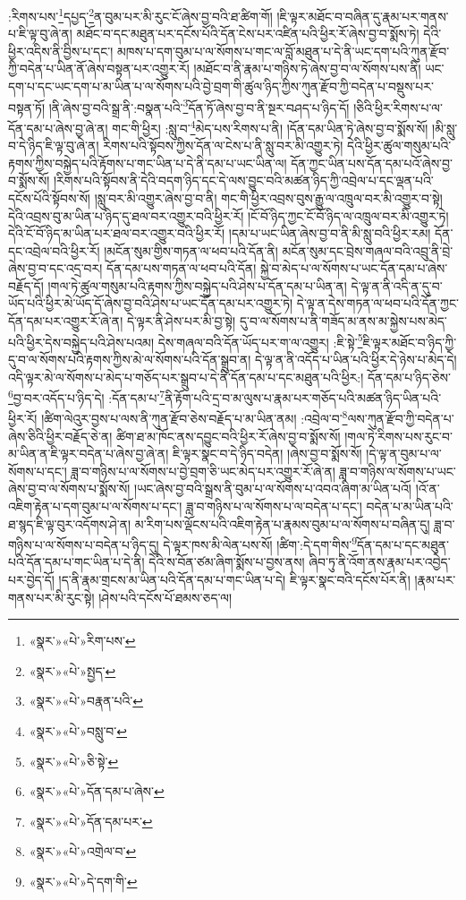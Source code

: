 :རིགས་པས་\footnote{«སྣར་»«པེ་»རིག་པས་}དཔྱད་\footnote{«སྣར་»«པེ་»སྤྱད་}ན་བུམ་པར་མི་རུང་ངོ་ཞེས་བྱ་བའི་ཐ་ཚིག་གོ། །ཇི་ལྟར་མཐོང་བ་བཞིན་དུ་རྣམ་པར་གནས་པ་ཇི་ལྟ་བུ་ཞེ་ན། མཐོང་བ་དང་མཐུན་པར་དངོས་པོའི་དོན་ངེས་པར་འཛིན་པའི་ཕྱིར་རོ་ཞེས་བྱ་བ་སྨོས་ཏེ། དེའི་ཕྱིར་འདིས་ནི་བྱིས་པ་དང་། མཁས་པ་དག་བུམ་པ་ལ་སོགས་པ་གང་ལ་བློ་མཐུན་པ་དེ་ནི་ཡང་དག་པའི་ཀུན་རྫོབ་ཀྱི་བདེན་པ་ཡིན་ནོ་ཞེས་བསྟན་པར་འགྱུར་རོ། །མཐོང་བ་ནི་རྣམ་པ་གཉིས་ཏེ་ཞེས་བྱ་བ་ལ་སོགས་པས་ནི། ཡང་དག་པ་དང་ཡང་དག་པ་མ་ཡིན་པ་ལ་སོགས་པའི་བྱེ་བྲག་གི་ཚུལ་ཉིད་ཀྱིས་ཀུན་རྫོབ་ཀྱི་བདེན་པ་བསྡུས་པར་བསྟན་ཏོ། །ནི་ཞེས་བྱ་བའི་སྒྲ་ནི་:བསྣན་པའི་\footnote{«སྣར་»«པེ་»བརྣན་པའི་}དོན་ཏོ་ཞེས་བྱ་བ་ནི་སྔར་བཤད་པ་ཉིད་དོ། །ཅིའི་ཕྱིར་རིགས་པ་ལ་དོན་དམ་པ་ཞེས་བྱ་ཞེ་ན། གང་གི་ཕྱིར། :སླུ་བ་\footnote{«སྣར་»«པེ་»བསླུ་བ་}མེད་པས་རིགས་པ་ནི། །དོན་དམ་ཡིན་ཏེ་ཞེས་བྱ་བ་སྨོས་སོ། །མི་སླུ་བ་དེ་ཉིད་ཇི་ལྟ་བུ་ཞེ་ན། རིགས་པའི་སྟོབས་ཀྱིས་དོན་ལ་ངེས་པ་ནི་སླུ་བར་མི་འགྱུར་ཏེ། དེའི་ཕྱིར་ཚུལ་གསུམ་པའི་རྟགས་ཀྱིས་བསྐྱེད་པའི་རྟོགས་པ་གང་ཡིན་པ་དེ་ནི་དམ་པ་ཡང་ཡིན་ལ། དོན་ཀྱང་ཡིན་པས་དོན་དམ་པའོ་ཞེས་བྱ་བ་སྨོས་སོ། །རིགས་པའི་སྟོབས་ནི་དེའི་བདག་ཉིད་དང་དེ་ལས་བྱུང་བའི་མཚན་ཉིད་ཀྱི་འབྲེལ་པ་དང་ལྡན་པའི་དངོས་པོའི་སྟོབས་སོ། །སླུ་བར་མི་འགྱུར་ཞེས་བྱ་བ་ནི། གང་གི་ཕྱིར་འབྲས་བུས་རྒྱུ་ལ་འཁྲུལ་བར་མི་འགྱུར་བ་སྟེ། དེའི་འབྲས་བུ་མ་ཡིན་པ་ཉིད་དུ་ཐལ་བར་འགྱུར་བའི་ཕྱིར་རོ། །ངོ་བོ་ཉིད་ཀྱང་ངོ་བོ་ཉིད་ལ་འཁྲུལ་བར་མི་འགྱུར་ཏེ། དེའི་ངོ་བོ་ཉིད་མ་ཡིན་པར་ཐལ་བར་འགྱུར་བའི་ཕྱིར་རོ། །དམ་པ་ཡང་ཡིན་ཞེས་བྱ་བ་ནི་མི་སླུ་བའི་ཕྱིར་རམ། དོན་དང་འབྲེལ་བའི་ཕྱིར་རོ། །མངོན་སུམ་གྱིས་གཏན་ལ་ཕབ་པའི་དོན་ནི། མངོན་སུམ་དང་བྲེས་གཞལ་བའི་འབྲུ་ནི་བྲེ་ཞེས་བྱ་བ་དང་འདྲ་བར། དོན་དམ་པས་གཏན་ལ་ཕབ་པའི་དོན། སྐྱེ་བ་མེད་པ་ལ་སོགས་པ་ཡང་དོན་དམ་པ་ཞེས་བརྗོད་དོ། །གལ་ཏེ་ཚུལ་གསུམ་པའི་རྟགས་ཀྱིས་བསྐྱེད་པའི་ཤེས་པ་དོན་དམ་པ་ཡིན་ན། དེ་ལྟ་ན་ནི་འདི་ན་དུ་བ་ཡོད་པའི་ཕྱིར་མེ་ཡོད་དོ་ཞེས་བྱ་བའི་ཤེས་པ་ཡང་དོན་དམ་པར་འགྱུར་ཏེ། དེ་ལྟ་ན་དེས་གཏན་ལ་ཕབ་པའི་དོན་ཀྱང་དོན་དམ་པར་འགྱུར་རོ་ཞེ་ན། དེ་ལྟར་ནི་ཤེས་པར་མི་བྱ་སྟེ། དུ་བ་ལ་སོགས་པ་ནི་གཟོད་མ་ནས་མ་སྐྱེས་པས་མེད་པའི་ཕྱིར་དེས་བསྐྱེད་པའི་ཤེས་པའམ། དེས་གཞལ་བའི་དོན་ཡོད་པར་ག་ལ་འགྱུར། :ཇི་སྟེ་\footnote{«སྣར་»«པེ་»ཅི་སྟེ་}ཇི་ལྟར་མཐོང་བ་ཉིད་ཀྱི་དུ་བ་ལ་སོགས་པའི་རྟགས་ཀྱིས་མེ་ལ་སོགས་པའི་དོན་སྒྲུབ་ན། དེ་ལྟ་ན་ནི་འདོད་པ་ཡིན་པའི་ཕྱིར་དེ་ཉེས་པ་མེད་དེ། འདི་ལྟར་མེ་ལ་སོགས་པ་མེད་པ་གཅོད་པར་སྒྲུབ་པ་དེ་ནི་དོན་དམ་པ་དང་མཐུན་པའི་ཕྱིར:། དོན་དམ་པ་ཉིད་ཅེས་\footnote{«སྣར་»«པེ་»དོན་དམ་པ་ཞེས་}བྱ་བར་འདོད་པ་ཉིད་དེ། :དོན་དམ་པ་\footnote{«སྣར་»«པེ་»དོན་དམ་པར་}ནི་རྟོག་པའི་དྲ་བ་མ་ལུས་པ་རྣམ་པར་གཅོད་པའི་མཚན་ཉིད་ཡིན་པའི་ཕྱིར་རོ། །ཚིག་ལེའུར་བྱས་པ་ལས་ནི་ཀུན་རྫོབ་ཅེས་བརྗོད་པ་མ་ཡིན་ནམ། :འབྲེལ་བ་\footnote{«སྣར་»«པེ་»འགྲེལ་བ་}ལས་ཀུན་རྫོབ་ཀྱི་བདེན་པ་ཞེས་ཅིའི་ཕྱིར་བརྗོད་ཅེ་ན། ཚིག་ཐ་མ་ཁོང་ནས་དབྱུང་བའི་ཕྱིར་རོ་ཞེས་བྱ་བ་སྨོས་སོ། །གལ་ཏེ་རིགས་པས་རུང་བ་མ་ཡིན་ན་ཇི་ལྟར་བདེན་པ་ཞེས་བྱ་ཞེ་ན། ཇི་ལྟར་སྣང་བ་དེ་ཉིད་བདེན། །ཞེས་བྱ་བ་སྨོས་སོ། །དེ་ལྟ་ན་བུམ་པ་ལ་སོགས་པ་དང་། ཟླ་བ་གཉིས་པ་ལ་སོགས་པ་བྱེ་བྲག་ཅི་ཡང་མེད་པར་འགྱུར་རོ་ཞེ་ན། ཟླ་བ་གཉིས་ལ་སོགས་པ་ཡང་ཞེས་བྱ་བ་ལ་སོགས་པ་སྨོས་སོ། །ཡང་ཞེས་བྱ་བའི་སྒྲས་ནི་བུམ་པ་ལ་སོགས་པ་འབའ་ཞིག་མ་ཡིན་པའོ། །འོ་ན་འཇིག་རྟེན་པ་དག་བུམ་པ་ལ་སོགས་པ་དང་། ཟླ་བ་གཉིས་པ་ལ་སོགས་པ་ལ་བདེན་པ་དང་། བདེན་པ་མ་ཡིན་པའི་ཐ་སྙད་ཇི་ལྟ་བུར་འདོགས་ཤེ་ན། མ་རིག་པས་ལྡོངས་པའི་འཇིག་རྟེན་པ་རྣམས་བུམ་པ་ལ་སོགས་པ་བཞིན་དུ། ཟླ་བ་གཉིས་པ་ལ་སོགས་པ་བདེན་པ་ཉིད་དུ། དེ་ལྟར་ཁས་མི་ལེན་པས་སོ། །ཚིག་:དེ་དག་གིས་\footnote{«སྣར་»«པེ་»དེ་དག་གི་}དོན་དམ་པ་དང་མཐུན་པའི་དོན་དམ་པ་གང་ཡིན་པ་དེ་ནི། དེའི་ས་བོན་ཙམ་ཞིག་སྨོས་པ་བྱས་ནས། ཞིབ་ཏུ་ནི་འོག་ནས་རྣམ་པར་འབྱེད་པར་བྱེད་དོ། །ད་ནི་རྣམ་གྲངས་མ་ཡིན་པའི་དོན་དམ་པ་གང་ཡིན་པ་དེ། ཇི་ལྟར་སྣང་བའི་དངོས་པོར་ནི། །རྣམ་པར་གནས་པར་མི་རུང་སྟེ། །ཤེས་པའི་དངོས་པོ་ཐམས་ཅད་ལ། 